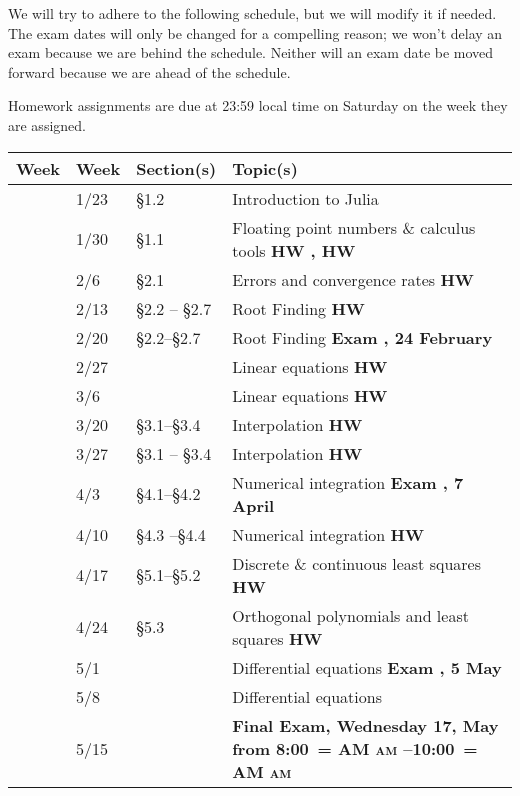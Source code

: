 \documentclass[12pt,fullpage]{article}
\makeatletter
\newcounter{qz}\setcounter{qz}{0}
\newcommand{\qz}{\setcounter{qz}{\value{qz}+1}\textbf{ \theqz}}
\newcounter{ex}\setcounter{ex}{0}
\newcommand{\ex}{%
\setcounter{ex}{\value{ex}+1}
Exam \theex}
\newcounter{wk}\setcounter{wk}{0}
\newcommand{\wk}{%
\setcounter{wk}{\value{wk}+1}
\thewk \,\,}
\DeclareRobustCommand{\maybefakesc}[1]{%
  \ifnum\pdfstrcmp{\f@series}{\bfdefault}=\z@
    {\fontsize{\dimexpr0.8\dimexpr\f@size pt\relax}{0}\selectfont\uppercase{#1}}%
  \else
    \textsc{#1}%
  \fi
}
\newcommand\AM{\,\maybefakesc{am}\xspace}
\newcommand\PM{\,\maybefakesc{pm}\xspace}
\newcommand{\ay}{2023}
\newcommand{\ay}{2023}
\newcommand{\finaldateandtime}{Wednesday 17, May  from 8:00\AM{}--10:00\AM}
\newcommand{\finaldateandtime}{Wednesday 17 May \ay \,\,  from 8:00\AM{}--10:00\PM}
\makeatother
\begin{document}
 We will try to adhere to the following schedule, but we will modify it
 if needed. The exam dates will only be changed for a compelling
 reason; we won't delay an exam because we are behind the
 schedule. Neither will an exam date be moved forward because we are
 ahead of the schedule.
 
 Homework assignments are due at 23:59 local time on Saturday on the week they are assigned. 
 
 \vspace{0.1in}
 
 \begin{center}
 
 \begin{tabular}  {|l|l|l|l|}
 \hline
 {\bf Week}  & {\bf Week} &  {\bf Section(s)} & {\bf Topic(s)} \\
 \hline \hline 
 \wk    & 1/23 &    \S1.2   &   Introduction to Julia   \hfill \\
 \wk    & 1/30 & \S1.1      &  Floating point numbers \& calculus tools   \hfill \textbf{HW  \qz,  HW \qz} \\
 \wk    & 2/6 &    \S2.1 & Errors and convergence rates    \hfill \textbf{HW  \qz} \\
 \wk    & 2/13  & \S2.2 -- \S2.7 &  Root Finding   \hfill  \textbf{HW \qz} \\
 \wk    & 2/20 &  \S2.2--\S2.7   &  Root Finding    \hfill \textbf{\ex\-\-, 24 February}   \\
 \wk    & 2/27    &  &  Linear equations  \hfill  \textbf{HW  \qz }  \\
 \wk    & 3/6    &  &  Linear equations  \hfill  \textbf{HW  \qz }  \\
 \wk    & 3/20     & \S3.1--\S3.4 & Interpolation \hfill \textbf{ HW  \qz }   \\
 \wk    & 3/27   & \S3.1 -- \S3.4   &   Interpolation   \hfill \textbf{ HW  \qz} \\
 \wk    & 4/3   & \S4.1--\S4.2 &  Numerical  integration  \hfill \textbf{\ex\-\-, 7 April} \\
 \wk    & 4/10    &   \S4.3 --\S4.4 &   Numerical integration    \hfill  \textbf{ HW  \qz} \\
 \wk    & 4/17 &   \S5.1--\S5.2 & Discrete \& continuous least squares  \hfill \textbf{HW    \qz} \\
 \wk    & 4/24  & \S5.3 &  Orthogonal polynomials and least squares  \hfill \textbf{HW \qz}   \\
 \wk    & 5/1  &   & Differential equations \hfill  \textbf{ \ex\-\-\-, 5 May}     \\
 \wk    & 5/8  &     & Differential equations   \hfill \\
 \wk    & 5/15       &  &   \textbf{Final Exam, \finaldateandtime} \\ \hline
 \end{tabular}
 \end{center}
 
\end{document}
